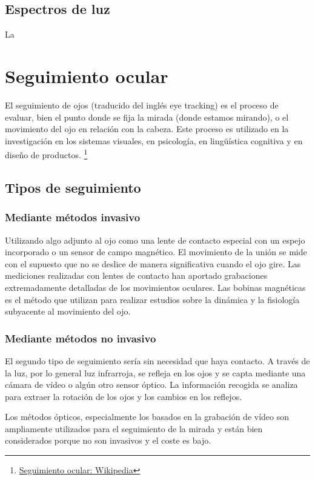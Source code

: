 \documentclass[12pt]{article} %
\begin{document}
    \subsection{Espectros de luz}
    	La 
	
\section{Seguimiento ocular \label{eyeGaze}}
	El seguimiento de ojos (traducido del inglés eye tracking) es el proceso de evaluar, bien el punto donde se fija la mirada (donde 
    estamos mirando), o el movimiento del ojo en relación con la cabeza. Este proceso es utilizado en la investigación en los sistemas
    visuales, en psicología, en lingüística cognitiva y en diseño de productos.
   	\footnote{\href{https://es.wikipedia.org/wiki/Seguimiento_de_ojos}{Seguimiento ocular: Wikipedia}}
    
    \subsection{Tipos de seguimiento}
    	\subsubsection{Mediante métodos invasivo}
        	Utilizando algo adjunto al ojo como una lente de contacto especial con un espejo incorporado o un sensor de campo magnético.
            El movimiento de la unión se mide con el supuesto que no se deslice de manera significativa cuando el ojo gire. Las mediciones
            realizadas con lentes de contacto han aportado grabaciones extremadamente detalladas de los movimientos oculares. Las bobinas
            magnéticas es el método que utilizan para realizar estudios sobre la dinámica y la fisiología subyacente al movimiento del ojo.
      	
        \subsubsection{Mediante métodos no invasivo}
        	El segundo tipo de seguimiento sería sin necesidad que haya contacto. A través de la luz, por lo general luz infrarroja, se
            refleja en los ojos y se capta mediante una cámara de vídeo o algún otro sensor óptico. La información recogida se analiza para
            extraer la rotación de los ojos y los cambios en los reflejos.
            
            Los métodos ópticos, especialmente los basados en la grabación de vídeo son ampliamente utilizados para el seguimiento de la
            mirada y están bien considerados porque no son invasivos y el coste es bajo.
\end{document}
